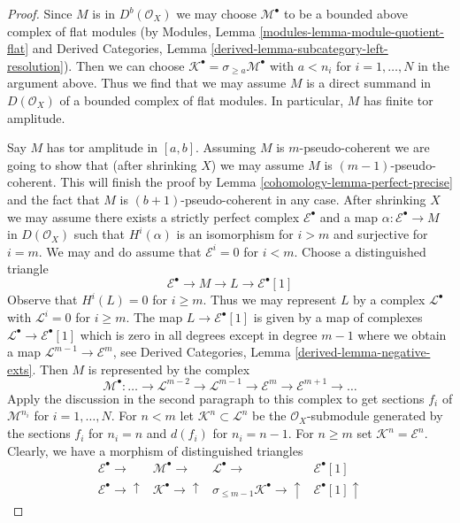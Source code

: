 \begin{proof}
\medskip\noindent
Since $M$ is in $D^b(\mathcal{O}_X)$ we may choose
$\mathcal{M}^\bullet$ to be a bounded above complex of
flat modules (by Modules, Lemma \ref{modules-lemma-module-quotient-flat} and
Derived Categories, Lemma \ref{derived-lemma-subcategory-left-resolution}).
Then we can choose $\mathcal{K}^\bullet = \sigma_{\geq a}\mathcal{M}^\bullet$
with $a < n_i$ for $i = 1, \ldots, N$ in the argument above.
Thus we find that we may assume $M$ is a direct summand in
$D(\mathcal{O}_X)$ of a bounded complex of flat modules.
In particular,  $M$ has finite tor amplitude.

\medskip\noindent
Say $M$ has tor amplitude in $[a, b]$. Assuming $M$ is $m$-pseudo-coherent
we are going to show that (after shrinking $X$) we may assume $M$
is $(m - 1)$-pseudo-coherent. This will finish the proof by
Lemma \ref{cohomology-lemma-perfect-precise} and the fact that
$M$ is $(b + 1)$-pseudo-coherent in any case.
After shrinking $X$ we may assume there exists a strictly perfect
complex $\mathcal{E}^\bullet$ and a map $\alpha : \mathcal{E}^\bullet \to M$
in $D(\mathcal{O}_X)$ such that $H^i(\alpha)$ is an isomorphism for
$i > m$ and surjective for $i = m$. We may and do assume
that $\mathcal{E}^i = 0$ for $i < m$. Choose a distinguished triangle
$$
\mathcal{E}^\bullet \to M \to L \to \mathcal{E}^\bullet[1]
$$
Observe that $H^i(L) = 0$ for $i \geq m$. Thus we may represent
$L$ by a complex $\mathcal{L}^\bullet$ with $\mathcal{L}^i = 0$
for $i \geq m$. The map $L \to \mathcal{E}^\bullet[1]$
is given by a map of complexes
$\mathcal{L}^\bullet \to \mathcal{E}^\bullet[1]$
which is zero in all degrees except in degree $m - 1$
where we obtain a map $\mathcal{L}^{m - 1} \to \mathcal{E}^m$, see
Derived Categories, Lemma \ref{derived-lemma-negative-exts}.
Then $M$ is represented by the complex
$$
\mathcal{M}^\bullet :
\ldots \to
\mathcal{L}^{m - 2} \to
\mathcal{L}^{m - 1} \to
\mathcal{E}^m \to
\mathcal{E}^{m + 1} \to \ldots
$$
Apply the discussion in the second paragraph to this complex to get
sections $f_i$ of $\mathcal{M}^{n_i}$ for $i = 1, \ldots, N$.
For $n < m$ let $\mathcal{K}^n \subset \mathcal{L}^n$
be the $\mathcal{O}_X$-submodule generated by the sections
$f_i$ for $n_i = n$ and $d(f_i)$ for $n_i = n - 1$.
For $n \geq m$ set $\mathcal{K}^n = \mathcal{E}^n$.
Clearly, we have a morphism of
distinguished triangles
$$
\begin{array}{cccc}\mathcal{E}^\bullet \longrightarrow & \mathcal{M}^\bullet \longrightarrow & \mathcal{L}^\bullet \longrightarrow & \mathcal{E}^\bullet[1] \\ \mathcal{E}^\bullet \longrightarrow\uparrow & \mathcal{K}^\bullet \longrightarrow\uparrow & \sigma_{\leq m - 1}\mathcal{K}^\bullet \longrightarrow\uparrow & \mathcal{E}^\bullet[1] \uparrow\end{array}
$$
\end{proof}
